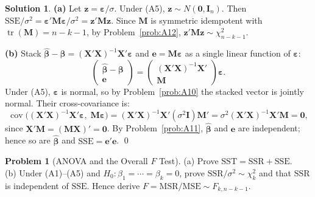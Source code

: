 \documentclass[12pt,a4paper]{article}
\theoremstyle{definition}
\newtheorem{exercise}{Problem}
\newtheorem*{solution*}{Solution}
\DeclareMathOperator\cov{cov}
\DeclareMathOperator\tr{tr}
\newcommand{\SST}{\mathrm{SST}}
\newcommand{\SSR}{\mathrm{SSR}}
\newcommand{\SSE}{\mathrm{SSE}}
\newcommand{\MSR}{\mathrm{MSR}}
\newcommand{\MSE}{\mathrm{MSE}}
\newcommand{\bX}{\mathbf{X}}
\def\bb{\boldsymbol{\beta}}
\newcommand{\be}{\boldsymbol{\varepsilon}}
\newcommand{\bI}{\mathbf{I}}
\newcommand{\bM}{\mathbf{M}}
\newcommand{\bzero}{\mathbf{0}}
\newcommand{\bz}{\mathbf{z}}
\begin{document}
\begin{solution*}
\textbf{(a)} Let $\bz = \be/\sigma$. Under (A5), $\bz \sim N(\bzero, \bI_n)$. Then $\SSE/\sigma^2 = \be'\bM\be/\sigma^2 = \bz'\bM\bz$. Since $\bM$ is symmetric idempotent with $\tr(\bM) = n-k-1$, by Problem~\ref{prob:A12}, $\bz'\bM\bz \sim \chi^2_{n-k-1}$.

\textbf{(b)} Stack $\hat{\bb} - \bb = (\bX'\bX)^{-1}\bX'\be$ and $\mathbf{e} = \bM\be$ as a single linear function of $\be$:
\[
\begin{pmatrix}\hat{\bb} - \bb \\ \mathbf{e}\end{pmatrix} = \begin{pmatrix}(\bX'\bX)^{-1}\bX' \\ \bM\end{pmatrix}\be.
\]
Under (A5), $\be$ is normal, so by Problem~\ref{prob:A10} the stacked vector is jointly normal. Their cross-covariance is:
\[
\cov\bigl((\bX'\bX)^{-1}\bX'\be,\;\bM\be\bigr) = (\bX'\bX)^{-1}\bX'(\sigma^2\bI)\bM' = \sigma^2(\bX'\bX)^{-1}\bX'\bM = \bzero,
\]
since $\bX'\bM = (\bM\bX)' = \bzero$. By Problem~\ref{prob:A11}, $\hat{\bb}$ and $\mathbf{e}$ are independent; hence so are $\hat{\bb}$ and $\SSE = \mathbf{e}'\mathbf{e}$. \qed
\end{solution*}

\begin{exercise}[ANOVA and the Overall $F$ Test]\label{prob:A15}
(a) Prove $\SST = \SSR + \SSE$.\\
(b) Under (A1)--(A5) and $H_0\colon \beta_1 = \cdots = \beta_k = 0$, prove $\SSR/\sigma^2 \sim \chi^2_k$ and that $\SSR$ is independent of $\SSE$. Hence derive $F = \MSR/\MSE \sim F_{k, n-k-1}$.
\end{exercise}
\end{document}
